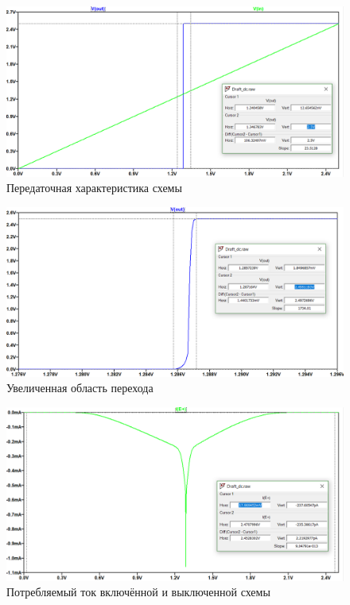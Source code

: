 \documentclass[a4paper,14pt]{article}
\begin{document}
\begin{figure}[H]
	\centering		
	\includegraphics[width=\linewidth]{image/dc_V_01}
	\caption{Передаточная характеристика схемы}\label{img:dc_V_01}
\end{figure}

\begin{figure}[H]
	\centering		
	\includegraphics[width=\linewidth]{image/dc_V}
	\caption{Увеличенная область перехода}\label{img:dc_V}
\end{figure}

\begin{figure}[H]
	\centering		
	\includegraphics[width=\linewidth]{image/dc_I}
	\caption{Потребляемый ток включённой и выключенной схемы}\label{img:dc_I}
\end{figure}
\end{document}

